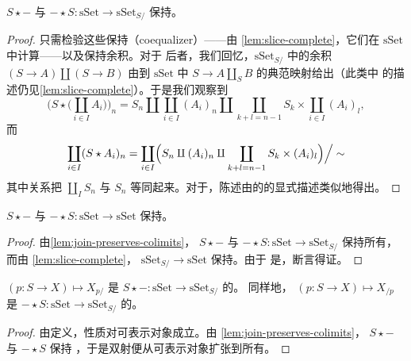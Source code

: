 \begin{lemma}\label{lem:join-preserves-colimits}
\trFunctor{} $S \star -$ 与 $- \star S\colon \mathrm{sSet} \to \mathrm{sSet}_{S/}$
保持\trColimit{}。
\end{lemma}

\begin{proof}
只需检验这些\trFunctor{}保持\trCoequalizer{}（coequalizer）——由%
\cref{lem:slice-complete}，它们在 $\mathrm{sSet}$ 中计算——以及保持余积。对于
后者，我们回忆，$\mathrm{sSet}_{S/}$ 中的余积 $(S \to A) \amalg (S \to B)$ 由到
$\mathrm{sSet}$ 中\trPushout{} $S \to A \amalg_S B$ 的典范映射给出（此类\trSlice{}中%
\trColimit{}的描述仍见\cref{lem:slice-complete}）。于是我们观察到
\[
\bigl(S \star \bigl(\coprod_{i \in I} A_i\bigr)\bigr)_n
= S_n \amalg \coprod_{i \in I} (A_i)_n \amalg
\coprod_{k+l=n-1} S_k \times \coprod_{i \in I} (A_i)_l,
\]
而
\[
\coprod_{i \in I} (S \star A_i)_n =
\Bigl. \coprod_{i \in I} \Bigl( S_n \amalg (A_i)_n \amalg
\coprod_{k+l=n-1} S_k \times (A_i)_l \Bigr) \Bigr/ \sim
\]
其中关系把 $\coprod_I S_n$ 与 $S_n$ 等同起来。对于\trCoequalizer{}，陈述由\trJoin{}的\trSimplex{}的显式描述类似地得出。
\end{proof}

\begin{corollary}\label{cor:join-preserves-pushouts}
\trFunctor{} $S \star -$ 与 $- \star S\colon \mathrm{sSet} \to \mathrm{sSet}$
保持\trPushout{}。
\end{corollary}

\begin{proof}
由\cref{lem:join-preserves-colimits}，\trFunctor{} $S \star -$ 与
$- \star S\colon \mathrm{sSet} \to \mathrm{sSet}_{S/}$ 保持所有\trColimit{}，而由
\cref{lem:slice-complete}，\trForgetfulFunctor{}%
$\mathrm{sSet}_{S/} \to \mathrm{sSet}$ 保持\trConnected{}\trColimit{}。由于%
\trPushout{}是\trConnected{}\trColimit{}，断言得证。
\end{proof}

\begin{corollary}\label{cor:slice-join-adjunction}
\trFunctor{} $(p\colon S \to X) \mapsto X_{p/}$ 是
$S \star -\colon \mathrm{sSet} \to \mathrm{sSet}_{S/}$ 的\trRightAdjoint{}。
同样地，\trFunctor{} $(p\colon S \to X) \mapsto X_{/p}$ 是
$- \star S\colon \mathrm{sSet} \to \mathrm{sSet}_{S/}$ 的\trRightAdjoint{}。
\end{corollary}

\begin{proof}
由定义，\trAdjunction{}性质对可表示对象成立。由%
\cref{lem:join-preserves-colimits}，\trFunctor{} $S \star -$ 与 $- \star S$ 保持%
\trColimit{}，于是\trAdjunction{}双射便从可表示对象扩张到所有\trSimplicialSets{}。
\end{proof}

